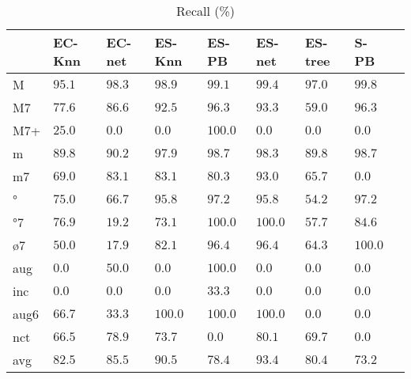 \documentclass{article}
\begin{document}
\begin{table}
  \centering
\begin{tabular}{l|p{0.5cm}p{0.5cm}p{0.5cm}p{0.5cm}p{0.5cm}p{0.5cm}p{0.5cm}p{0.5cm}}
       &      EC-Knn &      EC-net &      ES-Knn &       ES-PB &      ES-net &     ES-tree &        S-PB &  \\ \hline
   M & $     95.1$ & $     98.3$ & $     98.9$ & $     99.1$ & $     99.4$ & $     97.0$ & $     99.8$ &  \\
  M7 & $     77.6$ & $     86.6$ & $     92.5$ & $     96.3$ & $     93.3$ & $     59.0$ & $     96.3$ &  \\
 M7+ & $     25.0$ & $      0.0$ & $      0.0$ & $    100.0$ & $      0.0$ & $      0.0$ & $      0.0$ &  \\
   m & $     89.8$ & $     90.2$ & $     97.9$ & $     98.7$ & $     98.3$ & $     89.8$ & $     98.7$ &  \\
  m7 & $     69.0$ & $     83.1$ & $     83.1$ & $     80.3$ & $     93.0$ & $     65.7$ & $      0.0$ &  \\
  ° & $     75.0$ & $     66.7$ & $     95.8$ & $     97.2$ & $     95.8$ & $     54.2$ & $     97.2$ &  \\
 °7 & $     76.9$ & $     19.2$ & $     73.1$ & $    100.0$ & $    100.0$ & $     57.7$ & $     84.6$ &  \\
 ø7 & $     50.0$ & $     17.9$ & $     82.1$ & $     96.4$ & $     96.4$ & $     64.3$ & $    100.0$ &  \\
 aug & $      0.0$ & $     50.0$ & $      0.0$ & $    100.0$ & $      0.0$ & $      0.0$ & $      0.0$ &  \\
 inc & $      0.0$ & $      0.0$ & $      0.0$ & $     33.3$ & $      0.0$ & $      0.0$ & $      0.0$ &  \\
aug6 & $     66.7$ & $     33.3$ & $    100.0$ & $    100.0$ & $    100.0$ & $      0.0$ & $      0.0$ &  \\
 nct & $     66.5$ & $     78.9$ & $     73.7$ & $      0.0$ & $     80.1$ & $     69.7$ & $      0.0$ &  \\
\hline
 avg & $     82.5$ & $     85.5$ & $     90.5$ & $     78.4$ & $     93.4$ & $     80.4$ & $     73.2$ &  \\
\end{tabular}


  \caption{Recall (\%)}
  \label{tab:recall}
\end{table}
\end{document}
